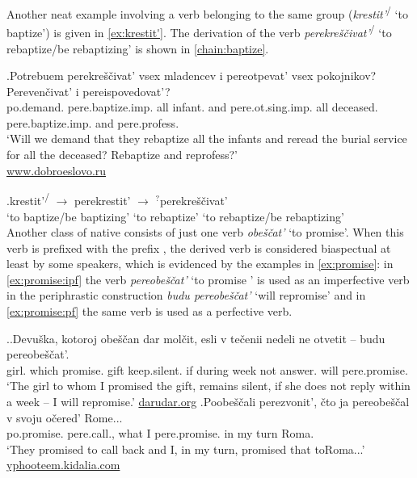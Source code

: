 Another neat example involving a verb belonging to the same group (\textit{krestit'}\textsuperscript{\IPF\slash\PF} `to baptize') is given in \ref{ex:krestit'}. The derivation of the verb \textit{perekre\v{s}\v{c}ivat'}\textsuperscript{\IPF\slash\PF} `to rebaptize/be rebaptizing' is shown in \ref{chain:baptize}.

\exg.\label{ex:krestit'}Potrebuem perekre\v{s}\v{c}ivat' vsex mladencev i pereotpevat' vsex pokojnikov? Pereven\v{c}ivat' i pereispovedovat'?\\
po.demand. pere.baptize.imp. all infant. and pere.ot.sing.imp. all deceased. pere.baptize.imp. and pere.profess.\\
\trans `Will we demand that they rebaptize all the infants and reread the burial service for all the deceased? Rebaptize and reprofess?'\\\hbox{}\hfill\hbox{\url{www.dobroeslovo.ru}}


\exg.\label{chain:baptize}krestit'\textsuperscript{\IPF\slash\PF} $\rightarrow$ perekrestit'\textsuperscript{\PF} $\rightarrow$ $^?$perekre\v{s}\v{c}ivat'\textsuperscript{\IPF}\\
{`to baptize/be baptizing'} {} {`to rebaptize'} {} {`to rebaptize/be rebaptizing'}\\

Another class of native  consists of just one verb \textit{obe\v{s}\v{c}at'} `to promise'. When this verb is prefixed with the  prefix , the derived verb is considered biaspectual at least by some speakers, which is evidenced by the examples in \ref{ex:promise}: in \ref{ex:promise:ipf} the verb \textit{pereobe\v{s}\v{c}at'} `to promise ' is used as an imperfective verb in the periphrastic  construction \textit{budu pereobe\v{s}\v{c}at'} `will repromise' and in \ref{ex:promise:pf} the same verb is used as a perfective verb. 

\ex.\label{ex:promise}\ag.\label{ex:promise:ipf}Devu\v{s}ka, kotoroj obe\v{s}\v{c}an dar mol\v{c}it, esli {v te\v{c}enii} nedeli ne otvetit -- budu pereobe\v{s}\v{c}at'.\\
girl. which promise. gift keep.silent. if during week not answer. {}  will pere.promise.\\
\trans `The girl to whom I promised the gift, remains silent, if she does not reply within a week -- I will repromise.'
\hbox{}\hfill\hbox{\url{darudar.org}}
\bg.\label{ex:promise:pf}Poobe\v{s}\v{c}ali perezvonit', \v{c}to ja pereobe\v{s}\v{c}al v svoju o\v{c}ered' Rome...\\
po.promise. pere.call., what I pere.promise. in my turn Roma.\\
\trans `They promised to call back and I, in my turn, promised that to\linebreak Roma...' \hfill\hbox{\url{yphooteem.kidalia.com}}

